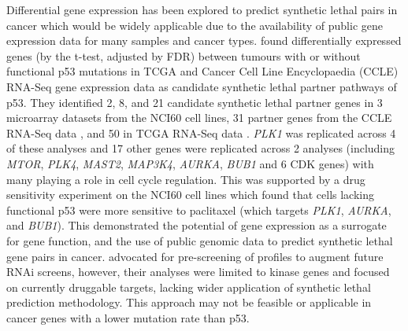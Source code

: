 Differential \gls{gene expression} has been explored to predict \gls{synthetic lethal} pairs in cancer which would be widely applicable due to the availability of public \gls{gene expression} data for many samples and cancer types. \citet{Wang2013} found differentially expressed genes (by the t-test, adjusted by \gls{FDR}) between \glspl{tumour} with or without functional p53 \glspl{mutation} in \gls{TCGA} \citep{TCGA2008GBM} and Cancer Cell Line Encyclopaedia (CCLE) \citep{Barretina2012} \gls{RNA-Seq} \gls{gene expression} data as candidate \gls{synthetic lethal} partner pathways of p53. They identified 2, 8, and 21 candidate \gls{synthetic lethal} partner genes in 3 \gls{microarray} datasets from the NCI60 cell lines, 31 partner genes from the CCLE \gls{RNA-Seq} data \citep{Barretina2012}, and 50 in \gls{TCGA} \gls{RNA-Seq} data \citep{TCGA2012CRC}. \textit{PLK1} was replicated across 4 of these analyses and 17 other genes were replicated across 2 analyses (including \textit{MTOR}, \textit{PLK4}, \textit{MAST2}, \textit{MAP3K4}, \textit{AURKA}, \textit{BUB1} and 6 CDK genes) with many playing a role in cell cycle regulation. This was supported by a drug sensitivity experiment on the NCI60 cell lines which found that cells lacking functional p53 were more sensitive to paclitaxel (which targets \textit{PLK1}, \textit{AURKA}, and \textit{BUB1}). This demonstrated the potential of \gls{gene expression} as a surrogate for gene function, and the use of public \gls{genomic} data to predict \gls{synthetic lethal} gene pairs in cancer. \citet{Wang2013} advocated for pre-screening of  profiles to augment future \gls{RNAi} screens, however, their analyses were limited to kinase genes and focused on currently druggable targets, lacking wider application of \gls{synthetic lethal} prediction methodology. This approach may not be feasible or applicable in \glspl{cancer gene} with a lower \gls{mutation} rate than p53.  

